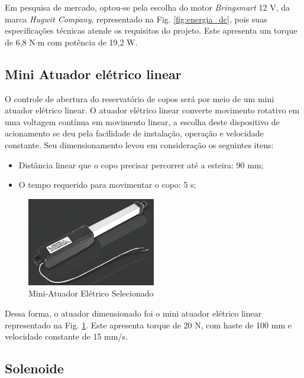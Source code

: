 Em pesquisa de mercado, optou-se pela escolha do motor \emph{Bringsmart} 12 V, da marca \emph{Hugwit Company}, representado na Fig. \ref{fig:energia_dc}, pois suas especificações técnicas atende os requisitos do projeto. Este apresenta um torque de 6,8 N$\cdot$m com potência de 19,2 W. 
 
\subsection{Mini Atuador elétrico linear}\label{energ:atuador_linear}

O controle de abertura do reservatório de copos será por meio de um mini atuador elétrico linear. O atuador elétrico linear converte movimento rotativo em uma voltagem contínua em movimento linear, a escolha deste dispositivo de acionamento se deu pela facilidade de instalação, operação e velocidade constante. Seu dimensionamento levou em consideração os seguintes itens:

\begin{itemize}
    \item Distância linear que o copo precisar percorrer até a esteira: 90 mm;
    \item O tempo requerido para movimentar o copo: 5 s;
\end{itemize}

\begin{figure}[H]
\centering
    \includegraphics[width=0.5\textwidth]{figuras/energia/fotos_componentes/Energia_atuador.png}
    \caption{Mini-Atuador Elétrico Selecionado}
    \label{fig:energia_atuador}
\end{figure}


Dessa forma, o atuador dimensionado foi o mini atuador elétrico linear representado na Fig. \ref{fig:energia_atuador}. Este apresenta torque de 20 N, com haste de 100 mm e velocidade constante de 15 mm/s.

\subsection{Solenoide}\label{energ:solenoide}

